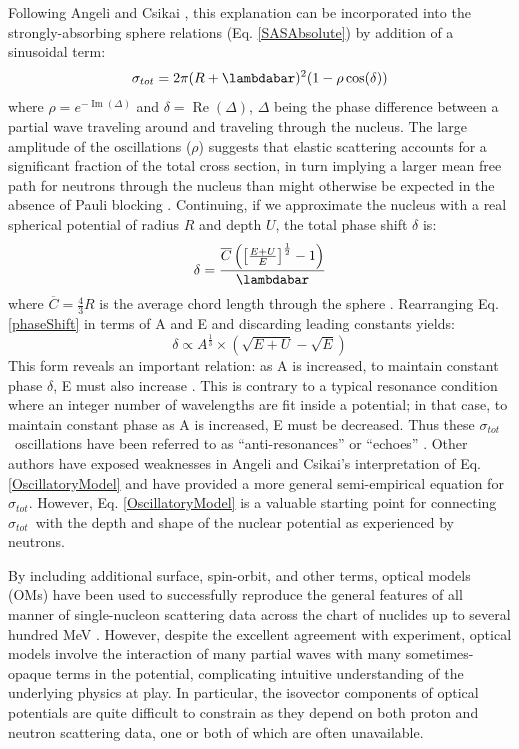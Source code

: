 \documentclass[twocolumn,secnumarabic,amssymb, nobibnotes, aps, prl,
superscriptaddress, nobalancelastpage]{revtex4}
\newcommand{\tot}{\ensuremath{\sigma_{tot}}}
\begin{document}
Following Angeli and Csikai \cite{Angeli1970}, this explanation can be
incorporated into the strongly-absorbing sphere relations (Eq. \ref{SASAbsolute}) 
by addition of a sinusoidal term:
\begin{equation} \label{OscillatoryModel}
    \tot = 2\pi (R+\lambdabar)^{2}(1 - \rho \cos(\delta))
\end{equation}
where $\rho = e^{-\operatorname{Im}(\Delta)}$ and $\delta =
\operatorname{Re}(\Delta)$, $\Delta$ being the phase difference between a
partial wave traveling
around and traveling through the nucleus. The large amplitude of the
oscillations ($\rho$) suggests that elastic scattering accounts for a
significant fraction of the total cross section, in turn implying a 
larger mean free path for neutrons through the nucleus 
than might otherwise be expected in the absence of Pauli blocking
\cite{Mohr1955, Feshbach1958}.
Continuing, if we approximate the nucleus with a
real spherical potential of radius $R$ and depth $U$, the total phase shift $\delta$ is:
\begin{equation} \label{phaseShift}
    \delta =
    \frac{\overline{C}\left(\left[{\frac{E+U}{E}}\right]^{\frac{1}{2}}-1\right)}{\lambdabar}
\end{equation}
where $\overline{C} = \frac{4}{3}R$ is the average chord length through the
sphere \cite{Angeli1970}. Rearranging Eq. \ref{phaseShift} in terms of A and E and
discarding leading constants yields:
\begin{equation}
    \delta \propto A^{\frac{1}{3}}\times\left(\sqrt{E+U}-\sqrt{E}\right)
\end{equation}
This form reveals an important relation: as A is increased, to maintain constant 
phase $\delta$, E must also increase \cite{Satchler1980, Peterson1962}. 
This is contrary to a typical resonance condition where an integer number of wavelengths
are fit inside a potential; in that case, to maintain constant phase as A is increased,
E must be decreased. Thus these \tot\ oscillations have been referred to as
``anti-resonances'' or ``echoes'' \cite{Satchler1980, McVoy1967}.
Other authors \cite{Ahmad1973} have
exposed weaknesses in Angeli and Csikai's interpretation of
Eq. \ref{OscillatoryModel} and have provided a more general semi-empirical
equation for \tot. However, Eq. \ref{OscillatoryModel} is a valuable starting
point for connecting \tot\ with the depth and shape of the nuclear
potential as experienced by neutrons.

By including additional surface, spin-orbit, and other terms, optical models (OMs) have been 
used to successfully reproduce the general features of all manner of single-nucleon scattering 
data across the chart of nuclides up to several hundred MeV \cite{Perey1976,
CH89, KoningDelaroche}. However, despite the excellent agreement with experiment, optical models
involve the interaction of many partial waves with many sometimes-opaque terms
in the potential, complicating intuitive understanding of the underlying
physics at play. In particular, the isovector components of optical potentials
are quite difficult to constrain as they depend on both proton and neutron 
scattering data, one or both of which are often unavailable.
\end{document}
